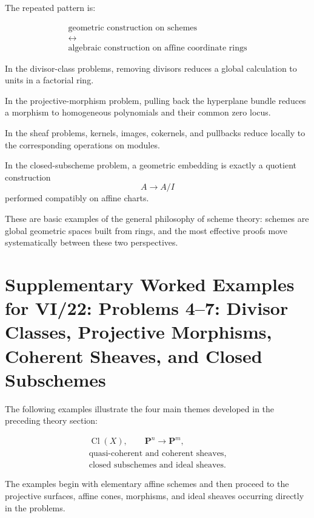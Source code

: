 The repeated pattern is:

\[
\boxed{\begin{gathered}
  \text{geometric construction on schemes}\\
  \longleftrightarrow\\
  \text{algebraic construction on affine coordinate rings}
\end{gathered}}
\]

In the divisor-class problems, removing divisors reduces a global calculation to units in a factorial ring.

In the projective-morphism problem, pulling back the hyperplane bundle reduces a morphism to homogeneous polynomials and their common zero locus.

In the sheaf problems, kernels, images, cokernels, and pullbacks reduce locally to the corresponding operations on modules.

In the closed-subscheme problem, a geometric embedding is exactly a quotient construction
\[
A\longrightarrow A/I
\]
performed compatibly on affine charts.

These are basic examples of the general philosophy of scheme theory: schemes are global geometric spaces built from rings, and the most effective proofs move systematically between these two perspectives.

\section*{Supplementary Worked Examples for VI/22: Problems 4--7:
	Divisor Classes, Projective Morphisms, Coherent Sheaves, and Closed Subschemes}

The following examples illustrate the four main themes developed in the preceding theory section:

\[
\begin{gathered}
\operatorname{Cl}(X),\qquad
\mathbf P^n\longrightarrow \mathbf P^m,\\[3pt]
\text{quasi-coherent and coherent sheaves},\\[3pt]
\text{closed subschemes and ideal sheaves}.
\end{gathered}
\]

The examples begin with elementary affine schemes and then proceed to the projective surfaces, affine cones, morphisms, and ideal sheaves occurring directly in the problems.

